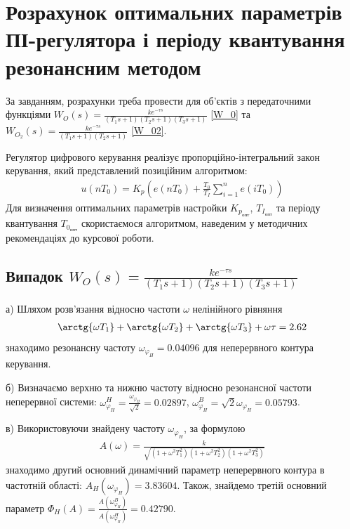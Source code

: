 \chapter{Розрахунок оптимальних параметрів ПІ-регулятора і 
періоду квантування резонансним методом}\label{ch:resonance}
За завданням, розрахунки треба провести для об'єктів з передаточними функціями
$W_O(s) = \frac{
    k e^{-\tau s}
}{
    (T_1 s + 1) (T_2 s + 1) (T_3 s + 1)
}$ \eqref{W_0} та
$
W_{O_2}(s) = \frac{k e^{-\tau s}}{(T_1 s + 1)(T_2 s + 1)}
$ \eqref{W_02}.

Регулятор цифрового керування реалізує пропорційно-інтегральний закон керування, який представлений позиційним алгоритмом:
\begin{gather*}
    u(n T_0) = K_p \left(
        e(n T_0) + \frac{T_0}{T_I} \sum_{i=1}^n e(i T_0)
    \right)
\end{gather*}
Для визначення оптимальних параметрів настройки $K_{p_{\text{опт}}}$, $T_{I_{\text{опт}}}$ та періоду квантування
$T_{0_{\text{опт}}}$ скористаємося алгоритмом, наведеним у методичних рекомендаціях до курсової роботи.

\section{Випадок \texorpdfstring{$W_O(s) = \frac{
    k e^{-\tau s}
}{
    (T_1 s + 1) (T_2 s + 1) (T_3 s + 1)
}$}{1}}
а)\;  Шляхом розв'язання відносно частоти $\omega$ нелінійного рівняння
\begin{gather}
    \arctg{\omega T_1} + \arctg{\omega T_2} + \arctg{\omega T_3} + \omega \tau = 2.62
\end{gather}
знаходимо резонансну частоту $\omega_{\varphi_H} = 0.04096$ для неперервного контура керування.

б)\;  Визначаємо верхню та нижню частоту відносно резонансної частоти неперервної системи:
$\omega_{\varphi_H}^H = \frac{\omega_{\varphi_H}}{\sqrt{2}} = 0.02897$, 
$\omega_{\varphi_H}^B = {\sqrt{2}}{\omega_{\varphi_H}} = 0.05793$.

в)\; Використовуючи знайдену частоту $\omega_{\varphi_H}$, за формулою
\begin{gather}
    A(\omega) = \frac{k}{\sqrt{\left(1+\omega^2 T_1^2\right)\left(1+\omega^2 T_2^2\right)\left(1+\omega^2 T_3^2\right)}}
\end{gather}
знаходимо другий основний динамічний параметр неперервного контура в частотній області:
$A_H\left(\omega_{\varphi_H}\right) = 3.83604$. Також, знайдемо третій основний параметр
$\Phi_H(A) = \frac{A\left(\omega_{\varphi_H}^B\right)}{A\left(\omega_{\varphi_H}^H\right)} = 0.42790$.

